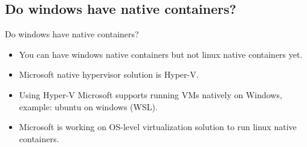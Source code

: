 \subsection{Do windows have native containers?}\label{subsec:windows-containers}
\begin{frame}{Do windows have native containers?}
    \begin{itemize}
        \item You can have windows native containers but not linux native containers yet.
        \item Microsoft native hypervisor solution is Hyper-V\@.
        \item Using Hyper-V Microsoft supports running VMs natively on Windows, example: ubuntu on windows (WSL).
        \item Microsoft is working on OS-level virtualization solution to run linux native containers.
    \end{itemize}
\end{frame}
